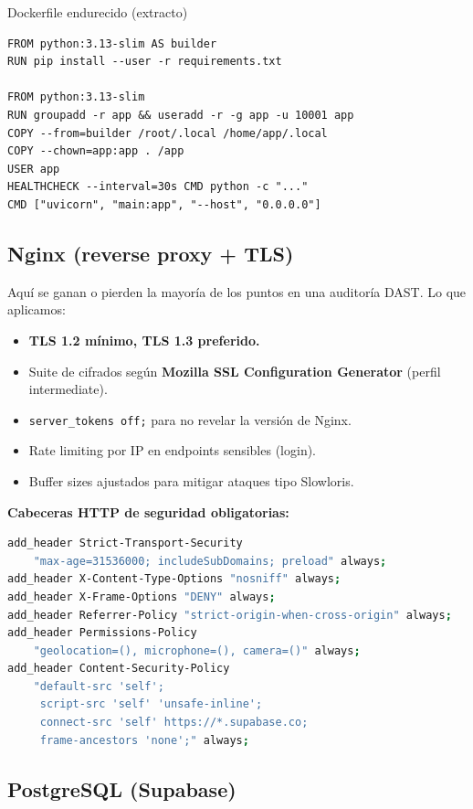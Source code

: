 \documentclass[12pt,a4paper,oneside]{article}
\begin{document}
\begin{infobox}{Dockerfile endurecido (extracto)}
\begin{verbatim}
FROM python:3.13-slim AS builder
RUN pip install --user -r requirements.txt

FROM python:3.13-slim
RUN groupadd -r app && useradd -r -g app -u 10001 app
COPY --from=builder /root/.local /home/app/.local
COPY --chown=app:app . /app
USER app
HEALTHCHECK --interval=30s CMD python -c "..."
CMD ["uvicorn", "main:app", "--host", "0.0.0.0"]
\end{verbatim}
\end{infobox}

\subsection{Nginx (reverse proxy + TLS)}

Aquí se ganan o pierden la mayoría de los puntos en una auditoría DAST. Lo que aplicamos:

\begin{itemize}[leftmargin=*]
  \item \textbf{TLS 1.2 mínimo, TLS 1.3 preferido.}
  \item Suite de cifrados según \textbf{Mozilla SSL Configuration Generator} (perfil intermediate).
  \item \texttt{server\_tokens off;} para no revelar la versión de Nginx.
  \item Rate limiting por IP en endpoints sensibles (login).
  \item Buffer sizes ajustados para mitigar ataques tipo Slowloris.
\end{itemize}

\textbf{Cabeceras HTTP de seguridad obligatorias:}

\begin{lstlisting}[language=bash]
add_header Strict-Transport-Security
    "max-age=31536000; includeSubDomains; preload" always;
add_header X-Content-Type-Options "nosniff" always;
add_header X-Frame-Options "DENY" always;
add_header Referrer-Policy "strict-origin-when-cross-origin" always;
add_header Permissions-Policy
    "geolocation=(), microphone=(), camera=()" always;
add_header Content-Security-Policy
    "default-src 'self';
     script-src 'self' 'unsafe-inline';
     connect-src 'self' https://*.supabase.co;
     frame-ancestors 'none';" always;
\end{lstlisting}

\subsection{PostgreSQL (Supabase)}
\end{document}

